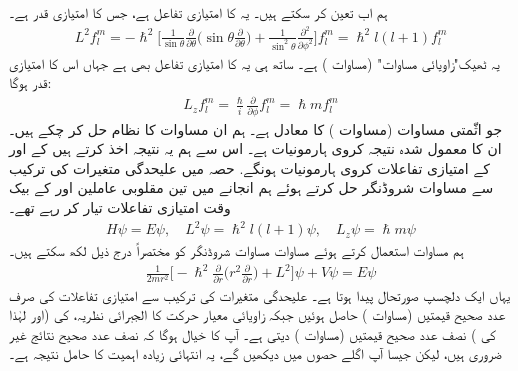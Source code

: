 ہم اب  تعین کر سکتے ہیں۔  یہ  کا امتیازی تفاعل ہے،  جس کا  امتیازی قدر  ہے۔
\begin{align*}
L^2 f_l^m = - \hslash^2 \big [ \frac{1}{\sin \theta} \frac{\partial}{\partial \theta} \big ( \sin \theta \frac{\partial}{\partial \theta} \big ) + \frac{1}{\sin^2 \theta} \frac{\partial^2}{\partial \phi^2} \big ] f_l^m = \hslash^2 l (l + 1) f_l^m
\end{align*}
یہ ٹھیک"زاویائی مساوات" (مساوات  )  ہے۔ ساتھ ہی یہ  کا امتیازی تفاعل بھی ہے جہاں اس کا امتیازی قدر  ہوگا: 
\begin{align*}
L_z f_l^m = \frac{\hslash}{i} \frac{\partial}{\partial \phi} f_l^m = \hslash m f_l^m
\end{align*}
جو اثّمتی  مساوات (مساوات )  کا معادل ہے۔ ہم ان مساوات کا نظام حل کر چکے ہیں۔ ان کا معمول شدہ نتیجہ کروی ہارمونیات  ہے۔  اس سے ہم یہ نتیجہ اخذ کرتے ہیں کے  اور  کے امتیازی تفاعلات کروی ہارمونیات ہونگے. حصہ   میں علیحدگی متغیرات کی ترکیب سے مساوات شروڈنگر حل کرتے ہوئے ہم  انجانے میں تین مقلوبی عاملین   اور  کے بیک وقت امتیازی تفاعلات تیار کر رہے تھے۔ 
\begin{align}
H \psi = E \psi , \quad L^2 \psi = \hslash^2 l (l + 1) \psi , \quad L_z \psi = \hslash m \psi
\end{align}
ہم مساوات   استعمال کرتے ہوئے مساوات مساوات شروڈنگر کو مختصراً  درج ذیل لکھ سکتے ہیں۔ 
\begin{align*}
\frac{1}{2m r^2} \big [ - \hslash^2 \frac{\partial}{\partial r} \big ( r^2 \frac{\partial}{\partial r} \big ) + L^2 \big ]  \psi + V \psi = E \psi
\end{align*}
یہاں ایک دلچسپ صورتحال پیدا ہوتا ہے۔ علیحدگی متغیرات کی ترکیب سے امتیازی تفاعلات کی صرف عدد صحیح  قیمتیں (مساوات )  حاصل ہوئیں جبکہ زاویائی معیار حرکت کا الجبرائی نظریہ،   کی (اور لہٰذا  کی )   نصف عدد صحیح قیمتیں (مساوات )  دیتی ہے۔ آپ کا خیال ہوگا کہ نصف عدد صحیح نتائج غیر ضروری ہیں، لیکن جیسا آپ اگلے حصوں میں دیکھیں گے،  یہ انتہائی زیادہ اہمیت کا حامل نتیجہ  ہے۔ 

